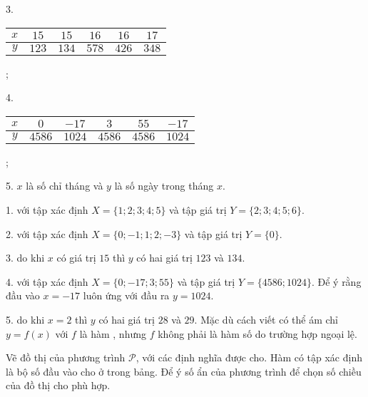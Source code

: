 3.
\begin{tabular}{|c|c|c|c|c|c|}
   \hline
   $x$ & $15$ & $15$ & $16$ & $16$ & $17$ \\
   \hline
   $y$ & $123$ & $134$ & $578$ & $426$ & $348$ \\
   \hline
\end{tabular};

4.
\begin{tabular}{|c|c|c|c|c|c|}
   \hline
   $x$ & $0$ & $-17$ & $3$ & $55$ & $-17$ \\
   \hline
   $y$ & $4586$ & $1024$ & $4586$ & $4586$ & $1024$ \\
   \hline
\end{tabular};

5. $x$ là số chỉ tháng và $y$ là số ngày trong tháng $x$.

\solution

1.  với tập xác định $X = \boxed{\{1; 2; 3; 4; 5\}}$ và tập giá trị $Y = \boxed{\{2; 3; 4; 5; 6\}}$.

2.  với tập xác định $X = \boxed{\{0; -1; 1; 2; -3\}}$ và tập giá trị $Y = \boxed{\{0\}}$.

3.  do khi $x$ có giá trị $15$ thì $y$ có hai giá trị $123$ và $134$.

4.  với tập xác định $X = \boxed{\{0; -17; 3; 55\}}$ và tập giá trị $Y = \boxed{\{4586; 1024\}}$. Để ý rằng đầu vào $x=-17$ luôn ứng với đầu ra $y = 1024$.

5.  do khi $x = 2$ thì $y$ có hai giá trị $28$ và $29$. Mặc dù cách viết có thể ám chỉ $y=f(x)$ với $f$ là hàm , nhưng $f$ không phải là hàm số do  trường hợp ngoại lệ.

 Vẽ đồ thị của phương trình $\mathcal{P}$, với các định nghĩa được cho. Hàm có tập xác định là bộ số đầu vào cho ở trong bảng. Để ý số ẩn của phương trình để chọn số chiều của đồ thị cho phù hợp.


